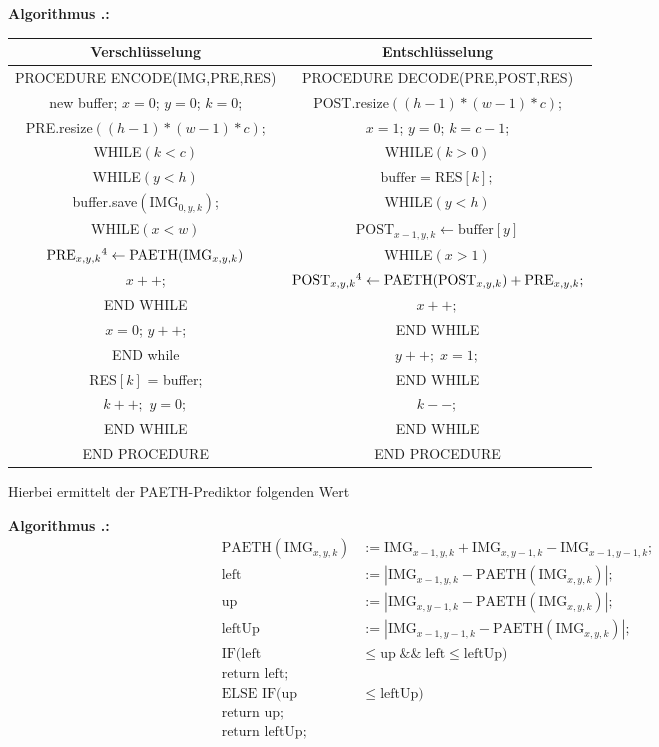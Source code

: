 \documentclass[a4paper,12pt]{article}
\newcounter{Algorithmus}
\newenvironment{Algorithmus}{
\medskip
        
        \setlength{\parindent}{0pt}
        \addtocounter{Algorithmus}{1}
        \textbf{\textsf{Algorithmus \thesubsection.\theAlgorithmus}:}}{
        \nopagebreak
        \vspace{-1.0ex}
        \bigskip
        
}
\begin{document}
\begin{Algorithmus}
\\
\begin{tabular}{c|c}
Verschlüsselung & Entschlüsselung
\\
\hline
PROCEDURE ENCODE(IMG,PRE,RES) & PROCEDURE DECODE(PRE,POST,RES)
\\
new buffer; $x=0$; $y=0$; $k=0$; & POST.resize$((h-1)*(w-1)*c)$;
\\
PRE.resize$((h-1)*(w-1)*c)$; & $x=1$; $y=0$; $k=c-1$;
\\
WHILE$(k < c)$ &                  WHILE$(k > 0)$
\\
WHILE$(y < h)$ &               $\text{buffer} = \text{RES}[k];$
\\
buffer.save$(\text{IMG}_{0,y,k})$; &  WHILE$(y < h)$
\\
WHILE$(x < w)$ &  $\text{POST}_{x-1,y,k}\leftarrow \text{buffer}[y]$        
\\
$\text{PRE}_{x,y,k}\footnotemark[4]\leftarrow \text{PAETH}(\text{IMG}_{x,y,k})$ & WHILE$(x>1)$
\\
$x++$; &  $\text{POST}_{x,y,k}\footnotemark[4]\leftarrow \text{PAETH}(\text{POST}_{x,y,k}) + \text{PRE}_{x,y,k};$
\\
END WHILE & $x++;$
\\
$x=0$; $y++$; & END WHILE
\\
 END while &  $y++;\;x=1;$
\\
 RES$[k]$ = buffer; &  END WHILE 
\\
$k++;$ $y=0;$  & $k--;$
\\
END WHILE & END WHILE  
\\
END PROCEDURE  &  END PROCEDURE
\end{tabular}
\end{Algorithmus}
Hierbei ermittelt der PAETH-Prediktor folgenden Wert
\begin{Algorithmus}
\begin{align*}
\text{PAETH}(\text{IMG}_{x,y,k})&:= \text{IMG}_{x-1,y,k}  + \text{IMG}_{x,y-1,k} - \text{IMG}_{x-1,y-1,k};
\\
\text{left}&:=\left|\text{IMG}_{x-1,y,k} - \text{PAETH}(\text{IMG}_{x,y,k})\right|; 
\\
\text{up}&:=\left|\text{IMG}_{x,y-1,k} - \text{PAETH}(\text{IMG}_{x,y,k})\right|;
\\
\text{leftUp}&:=\left|\text{IMG}_{x-1,y-1,k} - \text{PAETH}(\text{IMG}_{x,y,k})\right|;
\\
\text{IF}(\text{left}& \leq \text{up} \;\&\&\;  \text{left} \leq \text{leftUp})
\\
\text{return left;}
\\
\text{ELSE IF}(\text{up}& \leq \text{leftUp})
\\
\text{return up;}
\\
\text{return leftUp;}
\end{align*}
\end{Algorithmus}
\end{document}
